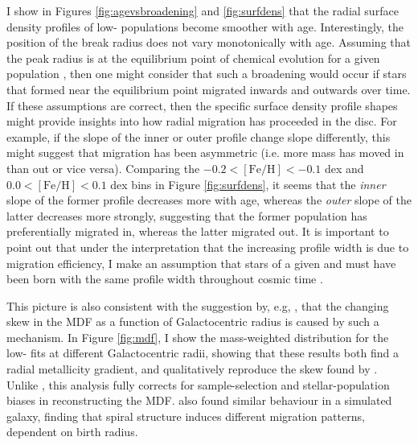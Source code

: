 I show in Figures \ref{fig:agevsbroadening} and \ref{fig:surfdens}  that the radial surface density profiles of low-\afe{} populations become smoother with age. Interestingly, the position of the break radius does not vary monotonically with age. Assuming that the peak radius is at the equilibrium point of chemical evolution for a given population  \citep[where the consumption of gas and its dilution are balanced, as discussed in][]{2016ApJ...823...30B}, then one might consider that such a broadening would occur if stars that formed near the equilibrium point migrated inwards and outwards over time.  If these assumptions are correct, then the specific surface density profile shapes might provide insights into how radial migration has proceeded in the disc. For example, if the slope of the inner or outer profile change slope differently, this might suggest that migration has been asymmetric (i.e. more mass has moved in than out or vice versa). Comparing the $-0.2 <\mathrm{[Fe/H]}<-0.1$ dex and $0.0 <\mathrm{[Fe/H]}<0.1$ dex bins in Figure \ref{fig:surfdens}, it seems that the \emph{inner} slope of the former profile decreases more with age, whereas the \emph{outer} slope of the latter decreases more strongly, suggesting that the former population has preferentially migrated in, whereas the latter migrated out.  It is important to point out that under the interpretation that the increasing profile width is due to migration efficiency, I make an assumption that stars of a given \feh{} and \afe{} must have been born with the same profile width throughout cosmic time \citep[as discussed by, e.g.][]{2017ApJ...834...27M}.


This picture is also consistent with the suggestion by, e.g, \citet[][]{2015ApJ...808..132H,2011ApJ...737....8L}, that the changing skew in the MDF as a function of Galactocentric radius is caused by such a mechanism. In Figure \ref{fig:mdf}, I show the mass-weighted \feh{} distribution for the low-\afe{} fits at different Galactocentric radii, showing that these results both find a radial metallicity gradient, and qualitatively reproduce the skew found by \citet[][]{2015ApJ...808..132H}. Unlike \citet[][]{2015ApJ...808..132H}, this analysis fully corrects for sample-selection and stellar-population biases in reconstructing the MDF. \citet{2016MNRAS.460L..94G} also found similar behaviour in a simulated galaxy, finding that spiral structure induces different migration patterns, dependent on birth radius. 


